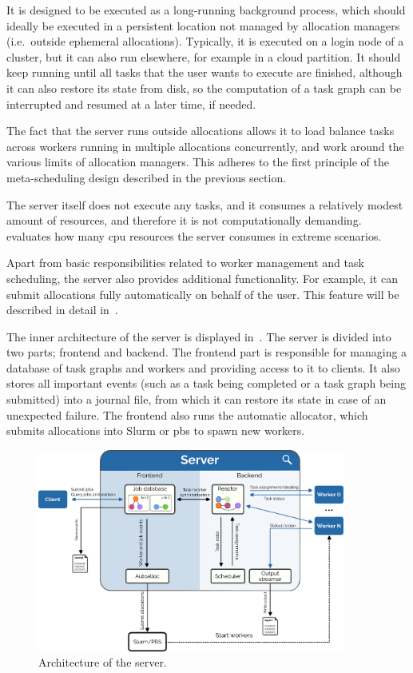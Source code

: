 It is designed to be executed as a long-running background process, which should ideally be
executed in a persistent location not managed by allocation managers (i.e.\ outside ephemeral
allocations). Typically, it is executed on a login node of a cluster, but it can also run
elsewhere, for example in a cloud partition. It should keep running until all tasks that the user
wants to execute are finished, although it can also restore its state from disk, so the computation
of a task graph can be interrupted and resumed at a later time, if needed.

The fact that the server runs outside allocations allows it to load balance tasks across workers
running in multiple allocations concurrently, and work around the various limits of allocation
managers. This adheres to the first principle of the meta-scheduling design described in the
previous section.

The server itself does not execute any tasks, and it consumes a relatively modest amount of
resources, and therefore it is not computationally demanding.~ evaluates how
many \gls{cpu} resources the server consumes in extreme scenarios.

Apart from basic responsibilities related to worker management and task scheduling, the server also
provides additional functionality. For example, it can submit allocations fully automatically on
behalf of the user. This feature will be described in detail in~.

The inner architecture of the server is displayed in~. The server is divided
into two parts; frontend and backend. The frontend part is responsible for managing a database of
task graphs and workers and providing access to it to clients. It also stores all important events
(such as a task being completed or a task graph being submitted) into a journal file, from which it
can restore its state in case of an unexpected failure. The frontend also runs the automatic
allocator, which submits allocations into Slurm or \gls{pbs} to spawn new workers.

\begin{figure}[h]
	\centering
	\includegraphics[width=0.9\textwidth]{imgs/hq/server-architecture}
	\caption{Architecture of the \hyperqueue{} server.}
	\label{fig:hq-server-architecture}
\end{figure}

